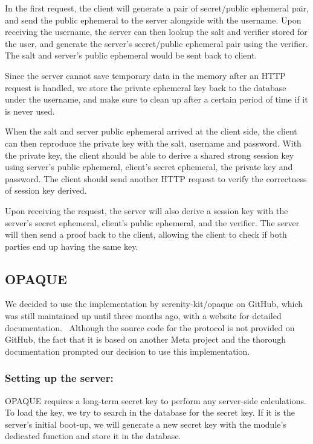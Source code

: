 In the first request, the client will generate a pair of secret/public ephemeral pair, and send the public ephemeral to the server alongside with the username.
Upon receiving the username, the server can then lookup the salt and verifier stored for the user, and generate the server's secret/public ephemeral pair using the verifier.
The salt and server's public ephemeral would be sent back to client.

Since the server cannot save temporary data in the memory after an HTTP request is handled, we store the private ephemeral key back to the database under the username, and make sure to clean up after a certain period of time if it is never used.

When the salt and server public ephemeral arrived at the client side, the client can then reproduce the private key with the salt, username and password.
With the private key, the client should be able to derive a shared strong session key using server's public ephemeral, client's secret ephemeral, the private key and password.
The client should send another HTTP request to verify the correctness of session key derived. 

Upon receiving the request, the server will also derive a session key with the server's secret ephemeral, client's public ephemeral, and the verifier.
The server will then send a proof back to the client, allowing the client to check if both parties end up having the same key.


\subsection{OPAQUE}
We decided to use the implementation by serenity-kit/opaque on GitHub, which was still maintained up until three months ago, with a website for detailed documentation.~\cite{OPAQUErepo}
Although the source code for the protocol is not provided on GitHub, the fact that it is based on another Meta project and the thorough documentation prompted our decision to use this implementation.

\subsubsection{Setting up the server:}
OPAQUE requires a long-term secret key to perform any server-side calculations.
To load the key, we try to search in the database for the secret key.
If it is the server's initial boot-up, we will generate a new secret key with the module's dedicated function and store it in the database.

